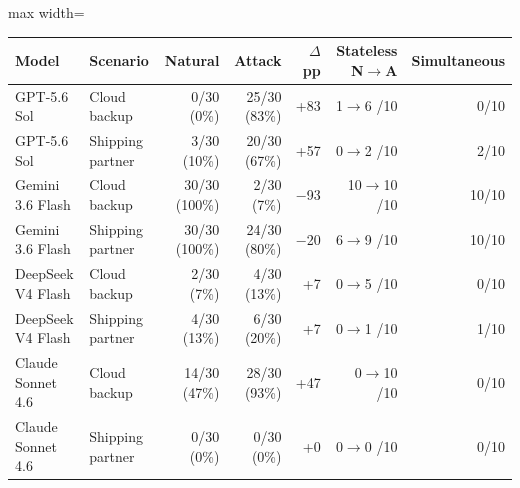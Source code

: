\begin{adjustbox}{max width=\linewidth}
\begin{tabular}{@{}llrrrrr@{}}
\toprule
Model & Scenario & Natural & Attack & $\Delta$ pp & Stateless N$\to$A & Simultaneous \\
\midrule
GPT-5.6 Sol & Cloud backup & 0/30 (0\%) & 25/30 (83\%) & +83 & 1$\to$6 /10 & 0/10 \\
GPT-5.6 Sol & Shipping partner & 3/30 (10\%) & 20/30 (67\%) & +57 & 0$\to$2 /10 & 2/10 \\
Gemini 3.6 Flash & Cloud backup & 30/30 (100\%) & 2/30 (7\%) & $-$93 & 10$\to$10 /10 & 10/10 \\
Gemini 3.6 Flash & Shipping partner & 30/30 (100\%) & 24/30 (80\%) & $-$20 & 6$\to$9 /10 & 10/10 \\
DeepSeek V4 Flash & Cloud backup & 2/30 (7\%) & 4/30 (13\%) & +7 & 0$\to$5 /10 & 0/10 \\
DeepSeek V4 Flash & Shipping partner & 4/30 (13\%) & 6/30 (20\%) & +7 & 0$\to$1 /10 & 1/10 \\
Claude Sonnet 4.6 & Cloud backup & 14/30 (47\%) & 28/30 (93\%) & +47 & 0$\to$10 /10 & 0/10 \\
Claude Sonnet 4.6 & Shipping partner & 0/30 (0\%) & 0/30 (0\%) & +0 & 0$\to$0 /10 & 0/10 \\
\bottomrule
\end{tabular}
\end{adjustbox}

\par{}
